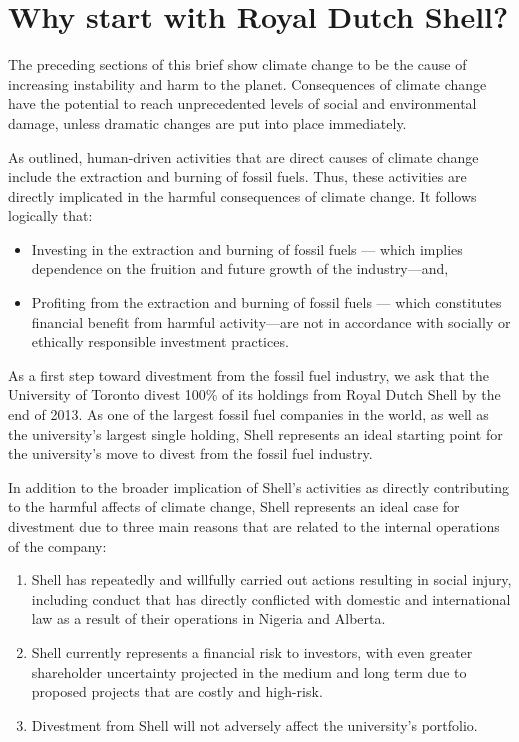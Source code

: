 
		\section{Why start with Royal Dutch Shell?}

The preceding sections of this brief show climate change to be the cause of increasing instability and harm to the planet. 
Consequences of climate change have the potential to reach unprecedented levels of social and environmental damage, unless dramatic changes are put into place immediately. 


As outlined, human-driven activities that are direct causes of climate change include the extraction and burning of fossil fuels. 
Thus, these activities are directly implicated in the harmful consequences of climate change. 
It follows logically that:
\begin{itemize}
	\item Investing in the extraction and burning of fossil fuels --- which implies dependence on the fruition and future growth of the industry—and, 
	\item Profiting from the extraction and burning of fossil fuels --- which constitutes financial benefit from harmful activity—are not in accordance with socially or ethically responsible investment practices.
\end{itemize}
As a first step toward divestment from the fossil fuel industry, we ask that the University of Toronto divest 100\% of its holdings from Royal Dutch Shell by the end of 2013. 
As one of the largest fossil fuel companies in the world, as well as the university’s largest single holding, Shell represents an ideal starting point for the university’s move to divest from the fossil fuel industry.
		
		
			
In addition to the broader implication of Shell's activities as directly contributing to the harmful affects of climate change, Shell represents an ideal case for divestment due to three main reasons that are related to the internal operations of the company: 
\begin{enumerate}
	\item Shell has repeatedly and willfully carried out actions resulting in social injury, including conduct that has directly conflicted with domestic and international law as a result of their operations in Nigeria and Alberta.
	\item Shell currently represents a financial risk to investors, with even greater shareholder uncertainty projected in the medium and long term due to proposed projects that are costly and high-risk.
	\item Divestment from Shell will not adversely affect the university’s portfolio.
\end{enumerate}

